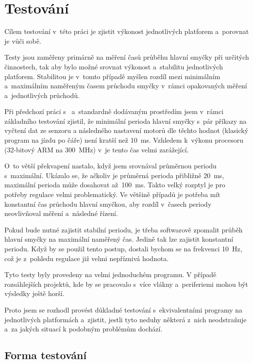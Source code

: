 \chapter{Testování}

Cílem testování v~této práci je zjistit výkonost jednotlivých platforem a~porovnat je vůči sobě. 

Testy jsou zaměřeny primárně na měření časů průběhu hlavní smyčky při určitých činnostech, tak aby bylo možné srovnat výkonost a~stabilitu jednotlivých platforem. 
Stabilitou je v~tomto případě myšlen rozdíl mezi minimálním a~maximálním naměřeným časem průchodu smyčky v~rámci opakovaných měření a~jednotlivých průchodů.

Při předchozí práci s~\EVthree{ } a~standardně dodávaným prostředím jsem v~rámci základního testování zjistil, že minimální perioda hlavní smyčky s~pár příkazy na vyčtení dat ze senzoru a následného nastavení motorů dle těchto hodnot (klasický program na jízdu po čáře) není kratší než 10~ms. 
Vzhledem k~výkonu procesoru (32-bitový ARM na 300~MHz) v~\EVthree{ }je tento čas velmi zarážející. 

O~to větší překvapení nastalo, když jsem srovnával průměrnou periodu s~maximální. Ukázalo se, že ačkoliv je průměrná perioda přibližně 20~ms, maximální perioda může dosahovat až~100~ms. 
Takto velký rozptyl je pro potřeby regulace velmi problematický. 
Ve většině případů je potřeba mít konstantní čas průchodu hlavní smyčkou, aby rozdíl v~časech periody neovlivňoval měření a~následné řízení. 

Pokud bude nutné zajistit stabilní periodu, je třeba softwarově zpomalit průběh hlavní smyčky na maximální naměřený čas. 
Jedině tak lze zajistit konstantní periodu. 
Když by se použil tento postup, dostali bychom se na frekvenci 10~Hz, což je z~pohledu regulace již velmi nepříznivá hodnota.

Tyto testy byly provedeny na velmi jednoduchém programu. 
V případě rozsáhlejších projektů, kde by se pracovalo s~více vlákny a~periferiemi mohou být výsledky ještě horší.

Proto jsem se rozhodl provést důkladné testování s~ekvivalentními programy na jednotlivých platformách a~zjistit, jestli tyto neduhy některá z~nich neodstraňuje a~za jakých situací k podobným problémům dochází.

\section{Forma testování}

